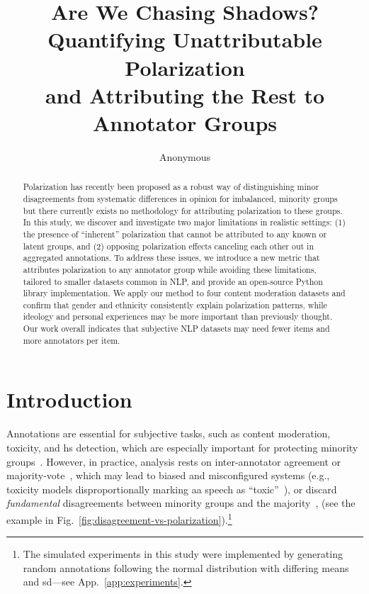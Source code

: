 \documentclass{article} %
\title{Are We Chasing Shadows? Quantifying Unattributable Polarization\\and Attributing the Rest to Annotator Groups}
\author{Anonymous}
\theoremstyle{definition}
\theoremstyle{plain}
\begin{document}
\maketitle

\begin{abstract}
	Polarization has recently been proposed as a robust way of distinguishing minor disagreements from systematic differences in opinion for imbalanced, minority groups but there currently exists no methodology for attributing polarization to these groups. In this study, we discover and investigate two major limitations in realistic settings: (1) the presence of ``inherent'' polarization that cannot be attributed to any known or latent groups, and (2) opposing polarization effects canceling each other out in aggregated annotations. To address these issues, we introduce a new metric that attributes polarization to any annotator group while avoiding these limitations, tailored to smaller datasets common in NLP, and provide an open-source Python library implementation. We apply our method to four content moderation datasets and confirm that gender and ethnicity consistently explain polarization patterns, while ideology and personal experiences may be more important than previously thought. Our work overall indicates that subjective NLP datasets may need fewer items and more annotators per item.
\end{abstract}


\section{Introduction}
\label{sec:intro}



Annotations are essential for subjective tasks, such as content moderation, toxicity, and \acf{hs} detection, which are especially important for protecting minority groups~\cite{un_hate_speech_targets, ucdavis_hate_speech}. However, in practice, analysis rests on inter-annotator agreement or majority-vote~\cite{ivey-etal-2025-nutmeg, petra_2022_handling, van_der_Velden}, which may lead to biased and misconfigured systems (e.g., toxicity models disproportionally marking \ac{aa} speech as ``toxic''~\cite{sap-etal-2019-risk}), or discard \emph{fundamental} disagreements between minority groups and the majority~\cite{quaranto2022dog}, (see the example in Fig.~\ref{fig:disagreement-vs-polarization}).\footnote{The simulated experiments in this study were implemented by generating random annotations following the normal distribution with differing means and \ac{sd}---see App.~\ref{app:experiments}.}
\end{document}
